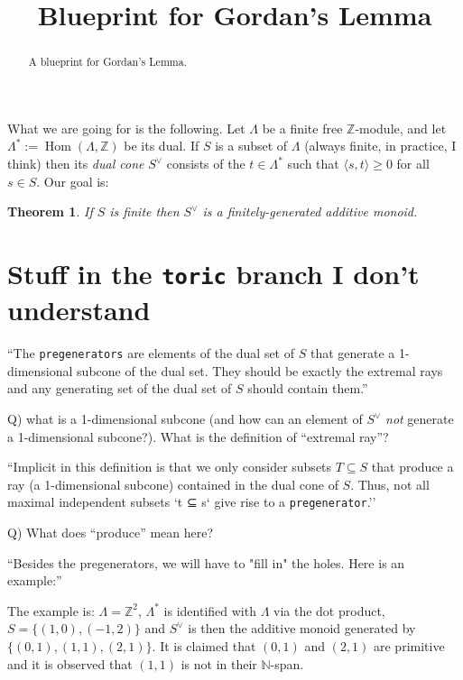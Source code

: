 \documentclass[english]{amsart}
\newcommand{\N}{\mathbb{N}}
\newcommand{\Z}{\mathbb{Z}}
\DeclareMathOperator{\Hom}{Hom}
\newtheorem{theorem}{Theorem}
\begin{document}
\title[]{Blueprint for Gordan's Lemma}

\begin{abstract}
A blueprint for Gordan's Lemma.
\end{abstract}

\maketitle

What we are going for is the following. Let $\Lambda$ be a finite free $\Z$-module, and let $\Lambda^*:=\Hom(\Lambda,\Z)$ be its dual. If $S$ is a subset of $\Lambda$ (always finite, in practice, I think) then its \emph{dual cone} $S^\vee$ consists of the $t\in\Lambda^*$ such that $\langle s,t\rangle\geq0$ for all $s\in S$. Our goal is:

\begin{theorem}If $S$ is finite then $S^\vee$ is a finitely-generated additive monoid.
\end{theorem}

\section{Stuff in the {\tt toric} branch I don't understand}

``The {\tt pregenerators} are elements of the dual set of $S$ that generate a 1-dimensional subcone of the dual set.  They should be exactly the extremal rays and any generating set of the dual set of $S$ should contain them.''

Q) what is a 1-dimensional subcone (and how can an element of $S^\vee$ \emph{not} generate a 1-dimensional subcone?). What is the definition of ``extremal ray''?

``Implicit in this definition is that we only consider subsets $T\subseteq S$ that produce a ray (a 1-dimensional subcone) contained in the dual cone of $S$.  Thus, not all maximal independent subsets `t ⊆ s` give rise to a {\tt pregenerator}.''

Q) What does ``produce'' mean here? 

``Besides the pregenerators, we will have to "fill in" the holes.  Here is an example:''

The example is: $\Lambda=\Z^2$, $\Lambda^*$ is identified with $\Lambda$ via the dot product, $S=\{(1,0),(-1,2)\}$ and $S^\vee$ is then the additive monoid generated by $\{(0,1),(1,1),(2,1)\}$. It is claimed that $(0,1)$ and $(2,1)$ are primitive and it is observed that $(1,1)$ is not in their $\N$-span.
\end{document}
